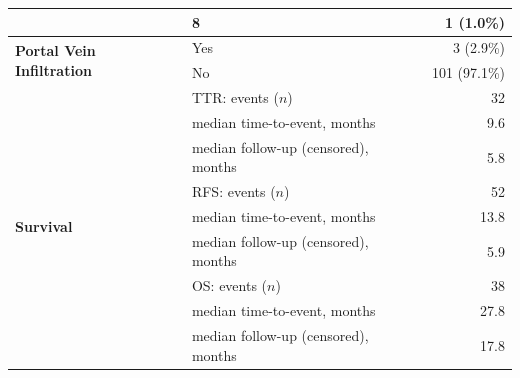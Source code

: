 \documentclass[12pt,twoside]{report}
\begin{document}
\begin{table}[H]
\begin{tabular}{p{3.8cm}lr}
  & 8 & 1 (1.0\%) \\
\hline
\multirow{2}{*}{\textbf{Portal Vein Infiltration}}
  & Yes & 3 (2.9\%) \\
  & No & 101 (97.1\%) \\
\hline
\multirow{9}{*}{\textbf{Survival}}
  & TTR: events ($n$) & 32 \\
  & \quad median time-to-event, months & 9.6 \\
  & \quad median follow-up (censored), months & 5.8 \\
  & RFS: events ($n$) & 52 \\
  & \quad median time-to-event, months & 13.8 \\
  & \quad median follow-up (censored), months & 5.9 \\
  & OS: events ($n$) & 38 \\
  & \quad median time-to-event, months & 27.8 \\
  & \quad median follow-up (censored), months & 17.8 \\
\hline
\end{tabular}
\end{table}
\end{document}
